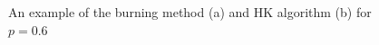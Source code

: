 \documentclass[11pt]{article}
\begin{document}
    \begin{figure}[H]
        \centering
        \caption{An example of the burning method (a) and HK algorithm (b) for $p = 0.6$}
        \label{fig:second}
    \end{figure}
\end{document}

